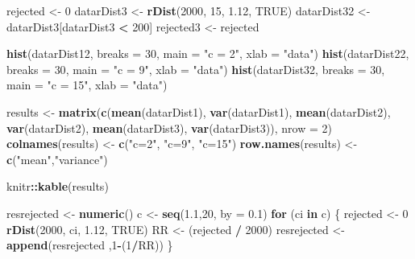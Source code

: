 \documentclass[
]{article}
\newenvironment{Shaded}{\begin{snugshade}}{\end{snugshade}}
\newcommand{\ControlFlowTok}[1]{\textcolor[rgb]{0.13,0.29,0.53}{\textbf{#1}}}
\newcommand{\DataTypeTok}[1]{\textcolor[rgb]{0.13,0.29,0.53}{#1}}
\newcommand{\DecValTok}[1]{\textcolor[rgb]{0.00,0.00,0.81}{#1}}
\newcommand{\FloatTok}[1]{\textcolor[rgb]{0.00,0.00,0.81}{#1}}
\newcommand{\KeywordTok}[1]{\textcolor[rgb]{0.13,0.29,0.53}{\textbf{#1}}}
\newcommand{\NormalTok}[1]{#1}
\newcommand{\OperatorTok}[1]{\textcolor[rgb]{0.81,0.36,0.00}{\textbf{#1}}}
\newcommand{\OtherTok}[1]{\textcolor[rgb]{0.56,0.35,0.01}{#1}}
\newcommand{\StringTok}[1]{\textcolor[rgb]{0.31,0.60,0.02}{#1}}
\begin{document}
\begin{Shaded}
\begin{Highlighting}[]
\NormalTok{rejected <-}\StringTok{ }\DecValTok{0}
\NormalTok{datarDist3 <-}\StringTok{ }\KeywordTok{rDist}\NormalTok{(}\DecValTok{2000}\NormalTok{, }\DecValTok{15}\NormalTok{, }\FloatTok{1.12}\NormalTok{, }\OtherTok{TRUE}\NormalTok{)}
\NormalTok{datarDist32 <-}\StringTok{ }\NormalTok{datarDist3[datarDist3 }\OperatorTok{<}\StringTok{ }\DecValTok{200}\NormalTok{]}
\NormalTok{rejected3 <-}\StringTok{ }\NormalTok{rejected}

\KeywordTok{hist}\NormalTok{(datarDist12, }\DataTypeTok{breaks =} \DecValTok{30}\NormalTok{, }\DataTypeTok{main =} \StringTok{"c = 2"}\NormalTok{, }\DataTypeTok{xlab =} \StringTok{"data"}\NormalTok{)}
\KeywordTok{hist}\NormalTok{(datarDist22, }\DataTypeTok{breaks =} \DecValTok{30}\NormalTok{, }\DataTypeTok{main =} \StringTok{"c = 9"}\NormalTok{, }\DataTypeTok{xlab =} \StringTok{"data"}\NormalTok{)}
\KeywordTok{hist}\NormalTok{(datarDist32, }\DataTypeTok{breaks =} \DecValTok{30}\NormalTok{, }\DataTypeTok{main =} \StringTok{"c = 15"}\NormalTok{, }\DataTypeTok{xlab =} \StringTok{"data"}\NormalTok{)}



\NormalTok{results <-}\StringTok{ }\KeywordTok{matrix}\NormalTok{(}\KeywordTok{c}\NormalTok{(}\KeywordTok{mean}\NormalTok{(datarDist1), }\KeywordTok{var}\NormalTok{(datarDist1), }\KeywordTok{mean}\NormalTok{(datarDist2), }\KeywordTok{var}\NormalTok{(datarDist2), }\KeywordTok{mean}\NormalTok{(datarDist3), }\KeywordTok{var}\NormalTok{(datarDist3)), }\DataTypeTok{nrow =} \DecValTok{2}\NormalTok{)}
\KeywordTok{colnames}\NormalTok{(results) <-}\StringTok{ }\KeywordTok{c}\NormalTok{(}\StringTok{"c=2"}\NormalTok{, }\StringTok{"c=9"}\NormalTok{, }\StringTok{"c=15"}\NormalTok{)}
\KeywordTok{row.names}\NormalTok{(results) <-}\StringTok{ }\KeywordTok{c}\NormalTok{(}\StringTok{"mean"}\NormalTok{,}\StringTok{"variance"}\NormalTok{)}

\NormalTok{knitr}\OperatorTok{::}\KeywordTok{kable}\NormalTok{(results) }

\NormalTok{resrejected <-}\StringTok{ }\KeywordTok{numeric}\NormalTok{()}
\NormalTok{c <-}\StringTok{ }\KeywordTok{seq}\NormalTok{(}\FloatTok{1.1}\NormalTok{,}\DecValTok{20}\NormalTok{, }\DataTypeTok{by =} \FloatTok{0.1}\NormalTok{)}
\ControlFlowTok{for}\NormalTok{ (ci }\ControlFlowTok{in}\NormalTok{ c) \{}
\NormalTok{  rejected <-}\StringTok{ }\DecValTok{0}
  \KeywordTok{rDist}\NormalTok{(}\DecValTok{2000}\NormalTok{, ci, }\FloatTok{1.12}\NormalTok{, }\OtherTok{TRUE}\NormalTok{)}
\NormalTok{  RR <-}\StringTok{ }\NormalTok{(rejected }\OperatorTok{/}\StringTok{ }\DecValTok{2000}\NormalTok{)}
\NormalTok{  resrejected <-}\StringTok{ }\KeywordTok{append}\NormalTok{(resrejected ,}\DecValTok{1}\OperatorTok{-}\NormalTok{(}\DecValTok{1}\OperatorTok{/}\NormalTok{RR))}
\NormalTok{\}}


\end{Highlighting}
\end{Shaded}
\end{document}
